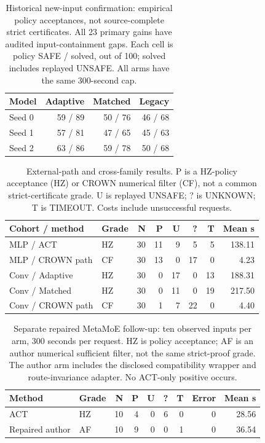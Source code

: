 \begin{table}[ht]
\centering\small
\caption{Historical new-input confirmation: empirical policy acceptances, not source-complete strict certificates. All 23 primary gains have audited input-containment gaps. Each cell is policy SAFE / solved, out of 100; solved includes replayed UNSAFE. All arms have the same 300-second cap.}
\label{tab:confirmation}
\begin{tabular}{lrrr}
\toprule
Model & Adaptive & Matched & Legacy \\
\midrule
Seed 0 & 59 / 89 & 50 / 76 & 46 / 68 \\
Seed 1 & 57 / 81 & 47 / 65 & 45 / 63 \\
Seed 2 & 63 / 86 & 59 / 78 & 50 / 68 \\
\bottomrule
\end{tabular}
\end{table}

\begin{table}[ht]
\centering\small
\caption{External-path and cross-family results. P is a HZ-policy acceptance (HZ) or CROWN numerical filter (CF), not a common strict-certificate grade. U is replayed UNSAFE; ? is UNKNOWN; T is TIMEOUT. Costs include unsuccessful requests.}
\label{tab:external}
\begin{tabular}{llrrrrrr}
\toprule
Cohort / method & Grade & N & P & U & ? & T & Mean s \\
\midrule
MLP / ACT & HZ & 30 & 11 & 9 & 5 & 5 & 138.11 \\
MLP / CROWN path & CF & 30 & 13 & 0 & 17 & 0 & 4.23 \\
Conv / Adaptive & HZ & 30 & 0 & 17 & 0 & 13 & 188.31 \\
Conv / Matched & HZ & 30 & 0 & 11 & 0 & 19 & 217.50 \\
Conv / CROWN path & CF & 30 & 1 & 7 & 22 & 0 & 4.40 \\
\bottomrule
\end{tabular}
\end{table}

\begin{table}[ht]
\centering\small
\caption{Separate repaired MetaMoE follow-up: ten observed inputs per arm, 300 seconds per request. HZ is policy acceptance; AF is an author numerical sufficient filter, not the same strict-proof grade. The author arm includes the disclosed compatibility wrapper and route-invariance adapter. No ACT-only positive occurs.}
\label{tab:metamoe}
\begin{tabular}{llrrrrrrr}
\toprule
Method & Grade & N & P & U & ? & T & Error & Mean s \\
\midrule
ACT & HZ & 10 & 4 & 0 & 6 & 0 & 0 & 28.56 \\
Repaired author & AF & 10 & 9 & 0 & 0 & 1 & 0 & 36.54 \\
\bottomrule
\end{tabular}
\end{table}
